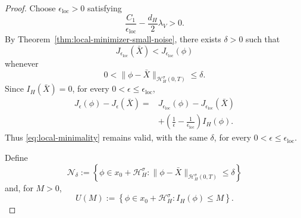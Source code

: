 \documentclass[preprint,12pt]{elsarticle}
\theoremstyle{definition}
\theoremstyle{plain}
\begin{document}
\begin{proof}
Choose $\epsilon_{\mathrm{loc}}>0$ satisfying
\begin{equation*}
    \frac{C_1}{\epsilon_{\mathrm{loc}}}
    -
    \frac{d_H}{2}\lambda_V
    >
    0.
\end{equation*}
By Theorem~\ref{thm:local-minimizer-small-noise}, there exists
$\delta>0$ such that
\begin{equation}
\label{eq:local-minimality}
    J_{\epsilon_{\mathrm{loc}}}(\bar X)
    <
    J_{\epsilon_{\mathrm{loc}}}(\phi)
\end{equation}
whenever
\begin{equation*}
    0<
    \|\phi-\bar X\|_{\mathcal H_H^\sigma(0,T)}
    \leq\delta.
\end{equation*}
Since $I_H(\bar X)=0$, for every
$0<\epsilon\leq\epsilon_{\mathrm{loc}}$,
\begin{align*}
    J_\epsilon(\phi)-J_\epsilon(\bar X)
    ={}&
    J_{\epsilon_{\mathrm{loc}}}(\phi)
    -
    J_{\epsilon_{\mathrm{loc}}}(\bar X)
    \\
    &+
    \left(
        \frac1\epsilon
        -
        \frac1{\epsilon_{\mathrm{loc}}}
    \right)
    I_H(\phi).
\end{align*}
Thus \eqref{eq:local-minimality} remains valid, with the same
$\delta$, for every $0<\epsilon\leq\epsilon_{\mathrm{loc}}$.

Define
\begin{equation}
\label{eq:Ndelta-def}
    \mathcal N_\delta
    :=
    \left\{
        \phi\in x_0+\mathcal H_H^\sigma:
        \|\phi-\bar X\|_{\mathcal H_H^\sigma(0,T)}
        \leq\delta
    \right\}
\end{equation}
and, for $M>0$,
\begin{equation}
\label{eq:UM-def}
    U(M)
    :=
    \left\{
        \phi\in x_0+\mathcal H_H^\sigma:
        I_H(\phi)\leq M
    \right\}.
\end{equation}


\end{proof}
\end{document}
